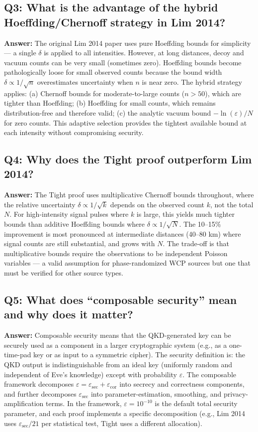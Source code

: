 \documentclass[11pt,a4paper,oneside]{report}
\begin{document}
\subsection*{Q3: What is the advantage of the hybrid Hoeffding/Chernoff strategy in Lim 2014?}
\textbf{Answer:} The original Lim 2014 paper uses pure Hoeffding bounds for simplicity — a single $\delta$ is applied to all intensities. However, at long distances, decoy and vacuum counts can be very small (sometimes zero). Hoeffding bounds become pathologically loose for small observed counts because the bound width $\delta \propto 1/\sqrt{n}$ overestimates uncertainty when $n$ is near zero. The hybrid strategy applies: (a) Chernoff bounds for moderate-to-large counts ($n > 50$), which are tighter than Hoeffding; (b) Hoeffding for small counts, which remains distribution-free and therefore valid; (c) the analytic vacuum bound $-\ln(\varepsilon)/N$ for zero counts. This adaptive selection provides the tightest available bound at each intensity without compromising security.

\subsection*{Q4: Why does the Tight proof outperform Lim 2014?}
\textbf{Answer:} The Tight proof uses multiplicative Chernoff bounds throughout, where the relative uncertainty $\delta \propto 1/\sqrt{k}$ depends on the observed count $k$, not the total $N$. For high-intensity signal pulses where $k$ is large, this yields much tighter bounds than additive Hoeffding bounds where $\delta \propto 1/\sqrt{N}$. The 10–15\% improvement is most pronounced at intermediate distances (40–80 km) where signal counts are still substantial, and grows with $N$. The trade-off is that multiplicative bounds require the observations to be independent Poisson variables — a valid assumption for phase-randomized WCP sources but one that must be verified for other source types.

\subsection*{Q5: What does ``composable security'' mean and why does it matter?}
\textbf{Answer:} Composable security means that the QKD-generated key can be securely used as a component in a larger cryptographic system (e.g., as a one-time-pad key or as input to a symmetric cipher). The security definition is: the QKD output is indistinguishable from an ideal key (uniformly random and independent of Eve's knowledge) except with probability $\varepsilon$. The composable framework decomposes $\varepsilon = \varepsilon_{\text{sec}} + \varepsilon_{\text{cor}}$ into secrecy and correctness components, and further decomposes $\varepsilon_{\text{sec}}$ into parameter-estimation, smoothing, and privacy-amplification terms. In the framework, $\varepsilon = 10^{-10}$ is the default total security parameter, and each proof implements a specific decomposition (e.g., Lim 2014 uses $\varepsilon_{\text{sec}}/21$ per statistical test, Tight uses a different allocation).
\end{document}
